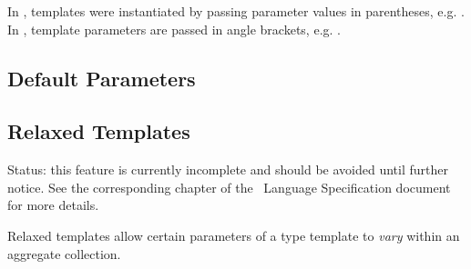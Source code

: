In \CAST, templates were instantiated by passing parameter values
in parentheses, e.g. .
In \hac, template parameters are passed in angle brackets, e.g.
.  

\subsection{Default Parameters}
\label{sec:templates:default}

\subsection{Relaxed Templates}
\label{sec:templates:relaxed}

Status: this feature is currently incomplete and should be avoided
until further notice.  
See the corresponding chapter of the \hac\ Language Specification
document for more details.  

Relaxed templates allow certain parameters of a type template
to \emph{vary} within an aggregate collection.  


